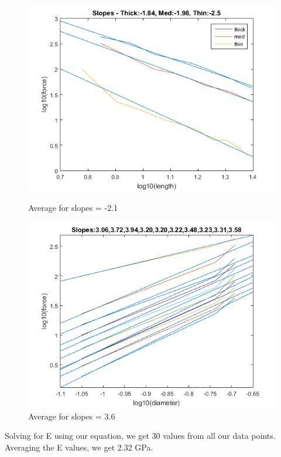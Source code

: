\documentclass[12pt]{article}
\begin{document}
\begin{figure}[h]
	\begin{minipage}{0.5\textwidth}
		\centering
		\includegraphics[scale=0.3]{Lab1f1.png}
		\caption{Average for slopes = -2.1}
	\end{minipage}%
	\begin{minipage}{0.5\textwidth}
		\centering
		\includegraphics[scale=0.3]{Lab1f3.png}
		\caption{Average for slopes = 3.6}
	\end{minipage}
\end{figure}

Solving for E using our equation, we get 30 values from all our data points. Averaging the E values, we get 2.32 GPa.
\end{document}
